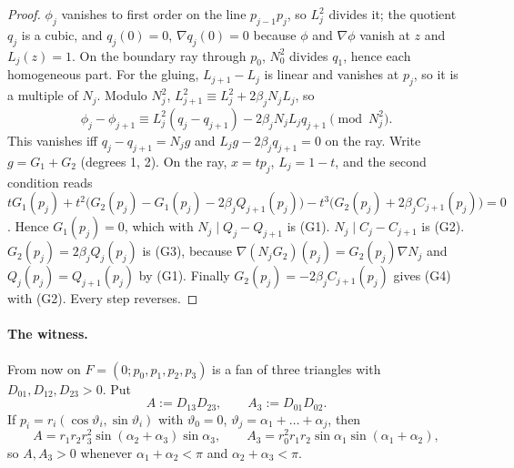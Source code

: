 \begin{proof}
$\phi_j$ vanishes to first order on the line $p_{j-1}p_j$, so $L_j^2$ divides it; the quotient $q_j$ is a cubic, and $q_j(0)=0$, $\nabla q_j(0)=0$ because $\phi$ and $\nabla\phi$ vanish at $z$ and $L_j(z)=1$. On the boundary ray through $p_0$, $N_0^2$ divides $q_1$, hence each homogeneous part. For the gluing, $L_{j+1}-L_j$ is linear and vanishes at $p_j$, so it is a multiple of $N_j$. Modulo $N_j^2$, $L_{j+1}^2\equiv L_j^2+2\beta_jN_jL_j$, so
\[
\phi_j-\phi_{j+1}\equiv L_j^2(q_j-q_{j+1})-2\beta_jN_jL_jq_{j+1}\pmod{N_j^2}.
\]
This vanishes iff $q_j-q_{j+1}=N_jg$ and $L_jg-2\beta_jq_{j+1}=0$ on the ray. Write $g=G_1+G_2$ (degrees 1, 2). On the ray, $x=tp_j$, $L_j=1-t$, and the second condition reads $tG_1(p_j)+t^2\bigl(G_2(p_j)-G_1(p_j)-2\beta_jQ_{j+1}(p_j)\bigr)-t^3\bigl(G_2(p_j)+2\beta_jC_{j+1}(p_j)\bigr)=0$. Hence $G_1(p_j)=0$, which with $N_j\mid Q_j-Q_{j+1}$ is (G1). $N_j\mid C_j-C_{j+1}$ is (G2). $G_2(p_j)=2\beta_jQ_j(p_j)$ is (G3), because $\nabla(N_jG_2)(p_j)=G_2(p_j)\nabla N_j$ and $Q_j(p_j)=Q_{j+1}(p_j)$ by (G1). Finally $G_2(p_j)=-2\beta_jC_{j+1}(p_j)$ gives (G4) with (G2). Every step reverses.
\end{proof}

\paragraph{The witness.} From now on $F=(0;p_0,p_1,p_2,p_3)$ is a fan of three triangles with $D_{01},D_{12},D_{23}>0$. Put
\[
A:=D_{13}D_{23},\qquad A_3:=D_{01}D_{02}.
\]
If $p_i=r_i(\cos\vartheta_i,\sin\vartheta_i)$ with $\vartheta_0=0$, $\vartheta_j=\alpha_1+\dots+\alpha_j$, then
\begin{equation}\label{m3:signs}
A=r_1r_2r_3^2\sin(\alpha_2+\alpha_3)\sin\alpha_3,\qquad A_3=r_0^2r_1r_2\sin\alpha_1\sin(\alpha_1+\alpha_2),
\end{equation}
so $A,A_3>0$ whenever $\alpha_1+\alpha_2<\pi$ and $\alpha_2+\alpha_3<\pi$.

